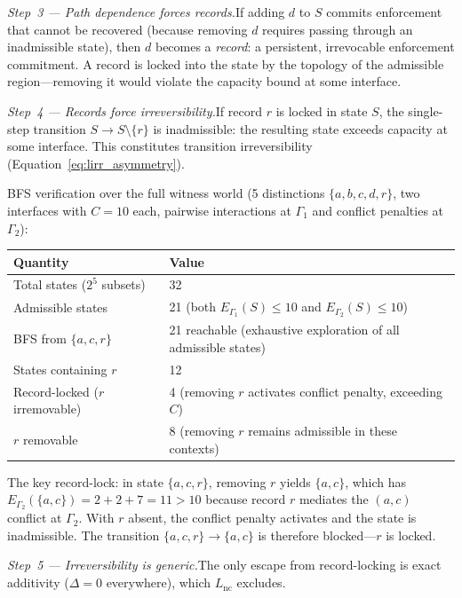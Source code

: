 \documentclass[11pt]{article}
\newcommand{\Lnc}{L_{\mathrm{nc}}}
\begin{document}
\textit{Step~3 --- Path dependence forces records.}\quad If adding $d$ to $S$ commits enforcement that cannot be recovered (because removing $d$ requires passing through an inadmissible state), then $d$ becomes a \emph{record}: a persistent, irrevocable enforcement commitment.  A record is locked into the state by the topology of the admissible region---removing it would violate the capacity bound at some interface.

\textit{Step~4 --- Records force irreversibility.}\quad If record $r$ is locked in state $S$, the single-step transition $S \to S \setminus \{r\}$ is inadmissible: the resulting state exceeds capacity at some interface.  This constitutes transition irreversibility (Equation~\eqref{eq:lirr_asymmetry}).

BFS verification over the full witness world (5 distinctions $\{a,b,c,d,r\}$, two interfaces with $C = 10$ each, pairwise interactions at $\Gamma_1$ and conflict penalties at $\Gamma_2$):

\smallskip
\begin{center}
\small
\begin{tabular}{lp{8cm}}
\toprule
\textbf{Quantity} & \textbf{Value} \\
\midrule
Total states ($2^5$ subsets) & 32 \\
Admissible states & 21 (both $E_{\Gamma_1}(S) \le 10$ and $E_{\Gamma_2}(S) \le 10$) \\
BFS from $\{a,c,r\}$ & 21 reachable (exhaustive exploration of all admissible states) \\
States containing $r$ & 12 \\
Record-locked ($r$ irremovable) & 4 (removing $r$ activates conflict penalty, exceeding $C$) \\
$r$ removable & 8 (removing $r$ remains admissible in these contexts) \\
\bottomrule
\end{tabular}
\end{center}
\smallskip

The key record-lock: in state $\{a,c,r\}$, removing $r$ yields $\{a,c\}$, which has $E_{\Gamma_2}(\{a,c\}) = 2 + 2 + 7 = 11 > 10$ because record $r$ mediates the $(a,c)$ conflict at $\Gamma_2$.  With $r$ absent, the conflict penalty activates and the state is inadmissible.  The transition $\{a,c,r\} \to \{a,c\}$ is therefore blocked---$r$ is locked.

\textit{Step~5 --- Irreversibility is generic.}\quad The only escape from record-locking is exact additivity ($\Delta = 0$ everywhere), which $\Lnc$ excludes.
\end{document}
